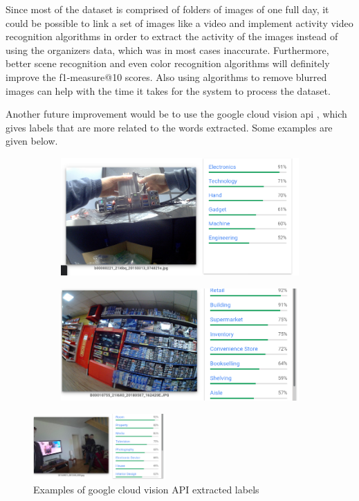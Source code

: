 Since most of the dataset is comprised of folders of images of one full day, it could be possible to link a set of images like a video and implement activity video recognition algorithms in order to extract the activity of the images instead of using the organizers data, which was in most cases inaccurate. Furthermore, better scene recognition and even color recognition algorithms will definitely improve the f1-measure@10 scores. Also using algorithms to remove blurred images can help with the time it takes for the system to process the dataset.

Another future improvement would be to use the google cloud vision api \cite{google}, which gives labels that are more related to the words extracted. Some examples are given below.


\begin{figure}[H]
    \centering
    \captionsetup{justification=centering}
    \begin{subfigure}{0.45\textwidth}
    \includegraphics[width=\textwidth]{Sections/8Conclusion/images/google.png} 
  
    \end{subfigure}
    \begin{subfigure}{0.45\textwidth}
    \includegraphics[width=\textwidth]{Sections/8Conclusion/images/labels.png}
    \end{subfigure}

  \end{figure}


\begin{figure}[H]
    \centering
    \captionsetup{justification=centering}

    \includegraphics[width=0.45\textwidth]{Sections/8Conclusion/images/google_labels_2.png}
    
    \caption{Examples of google cloud vision API extracted labels \cite{google}}
\end{figure}
